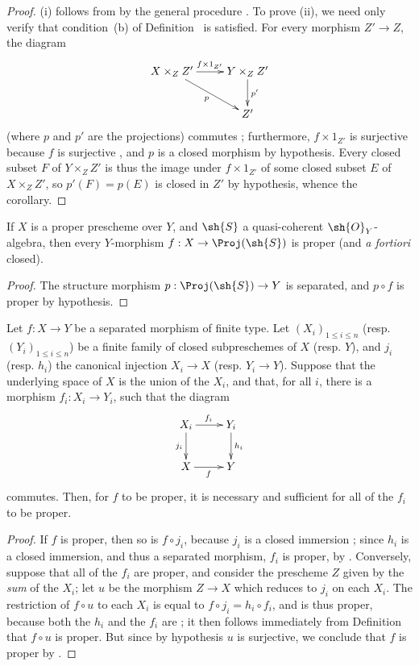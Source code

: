 \begin{proof}
(i) follows from  by the general procedure .
To prove (ii), we need only verify that condition~(b) of Definition~ is satisfied.
For every morphism $Z'\to Z$, the diagram
\[
  \xymatrix{
    X\times_Z Z'\ar[r]^{f\times1_{Z'}}\ar[dr]_p &
    Y\times_Z Z'\ar[d]^{p'}\\
    & Z'
  }
\]
(where $p$ and $p'$ are the projections) commutes ;
furthermore, $f\times1_{Z'}$ is surjective because $f$ is surjective , and $p$ is a closed morphism by hypothesis.
Every closed subset $F$ of $Y\times_Z Z'$ is thus the image under $f\times1_{Z'}$ of some closed subset $E$ of $X\times_Z Z'$, so $p'(F)=p(E)$ is closed in $Z'$ by hypothesis, whence the corollary.
\end{proof}

\begin{corollary}[5.4.4]
\label{II.5.4.4}
If $X$ is a proper prescheme over $Y$, and $\sh{S}$ a quasi-coherent $\sh{O}_Y$-algebra, then every $Y$-morphism $f:X\to\Proj(\sh{S})$ is proper (and \emph{a fortiori} closed).
\end{corollary}

\begin{proof}
The structure morphism $p:\Proj(\sh{S})\to Y$ is separated, and $p\circ f$ is proper by hypothesis.
\end{proof}

\begin{corollary}[5.4.5]
\label{II.5.4.5}
Let $f:X\to Y$ be a separated morphism of finite type.
Let $(X_i)_{1\leq i\leq n}$ (resp. $(Y_i)_{1\leq i\leq n}$) be a finite family of closed subpreschemes of $X$ (resp. $Y$), and $j_i$ (resp. $h_i$) the canonical injection $X_i\to X$ (resp. $Y_i\to Y$).
Suppose that the underlying space of $X$ is the union of the $X_i$, and that, for all $i$, there is a morphism $f_i:X_i\to Y_i$, such that the diagram
\[
  \xymatrix{
    X_i\ar[r]^{f_i}\ar[d]_{j_i} &
    Y_i\ar[d]^{h_i}\\
    X\ar[r]_f &
    Y
  }
\]
commutes.
Then, for $f$ to be proper, it is necessary and sufficient for all of the $f_i$ to be proper.
\end{corollary}

\begin{proof}
If $f$ is proper, then so is $f\circ j_i$, because $j_i$ is a closed immersion ;
since $h_i$ is a closed immersion, and thus a separated morphism, $f_i$ is proper, by .
Conversely, suppose that all of the $f_i$ are proper, and consider the prescheme $Z$ given by the \emph{sum} of the $X_i$; let $u$ be the morphism $Z\to X$ which reduces to $j_i$ on each $X_i$.
The restriction of $f\circ u$ to each $X_i$ is equal to $f\circ j_i=h_i\circ f_i$, and is thus proper, because both the $h_i$ and the $f_i$ are ;
it then follows immediately from Definition~ that $f\circ u$ is proper.
But since by hypothesis $u$ is surjective, we conclude that $f$ is proper by .
\end{proof}

